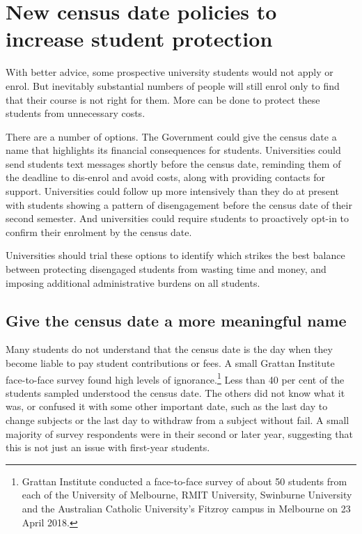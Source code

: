 \chapter{New census date policies to increase student protection }\label{chap:8}

With better advice, some prospective university students would not apply or enrol. But inevitably substantial numbers of people will still enrol only to find that their course is not right for them. More can be done to protect these students from unnecessary costs.

There are a number of options. The Government could give the census date a name that highlights its financial consequences for students. Universities could send students text messages shortly before the census date, reminding them of the deadline to dis-enrol and avoid costs, along with providing contacts for support. Universities could follow up more intensively than they do at present with students showing a pattern of disengagement before the census date of their second semester. And universities could require students to proactively opt-in to confirm their enrolment by the census date.

Universities should trial these options to identify which strikes the best balance between protecting disengaged students from wasting time and money, and imposing additional administrative burdens on all students.

\section{Give the census date a more meaningful name}\label{sec:8.0}

Many students do not understand that the census date is the day when they become liable to pay student contributions or fees. A small Grattan Institute face-to-face survey found high levels of ignorance.\footnote{Grattan Institute conducted a face-to-face survey of about 50 students from each of the University of Melbourne, RMIT University, Swinburne University and the Australian Catholic University's Fitzroy campus in Melbourne on 23 April 2018.} Less than 40 per cent of the students sampled understood the census date. The others did not know what it was, or confused it with some other important date, such as the last day to change subjects or the last day to withdraw from a subject without fail. A small majority of survey respondents were in their second or later year, suggesting that this is not just an issue with first-year students.

